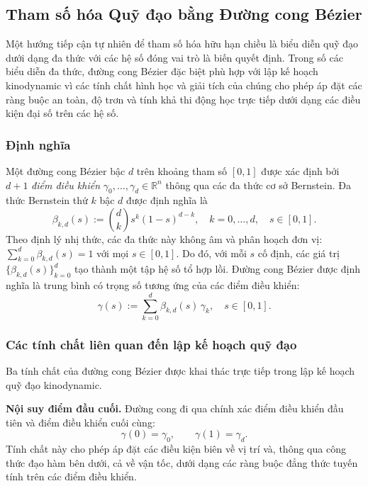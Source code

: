 \subsection{Tham số hóa Quỹ đạo bằng Đường cong Bézier}\label{subsec:bezier_parameterization}

Một hướng tiếp cận tự nhiên để tham số hóa hữu hạn chiều là biểu diễn quỹ đạo dưới dạng
đa thức với các hệ số đóng vai trò là biến quyết định.
Trong số các biểu diễn đa thức, đường cong Bézier đặc biệt phù hợp với lập kế hoạch
kinodynamic vì các tính chất hình học và giải tích của chúng cho phép áp đặt các ràng buộc
an toàn, độ trơn và tính khả thi động học trực tiếp dưới dạng các điều kiện đại số trên
các hệ số.

\subsubsection{Định nghĩa}

Một đường cong Bézier bậc $d$ trên khoảng tham số $[0,1]$ được xác định bởi
$d+1$ \emph{điểm điều khiển} $\gamma_0, \ldots, \gamma_d \in \mathbb{R}^{n}$
thông qua các đa thức cơ sở Bernstein.
Đa thức Bernstein thứ $k$ bậc $d$ được định nghĩa là
\begin{equation}
    \beta_{k,d}(s) := \binom{d}{k} s^{k}(1-s)^{d-k},
    \quad k = 0, \ldots, d, \quad s \in [0,1].
    \label{eq:bernstein}
\end{equation}
Theo định lý nhị thức, các đa thức này không âm và phân hoạch đơn vị:
$\sum_{k=0}^{d} \beta_{k,d}(s) = 1$ với mọi $s \in [0,1]$.
Do đó, với mỗi $s$ cố định, các giá trị $\{\beta_{k,d}(s)\}_{k=0}^{d}$ tạo thành một
tập hệ số tổ hợp lồi.
Đường cong Bézier được định nghĩa là trung bình có trọng số tương ứng của các điểm điều khiển:
\begin{equation}
    \gamma(s) := \sum_{k=0}^{d} \beta_{k,d}(s)\,\gamma_k,
    \quad s \in [0,1].
    \label{eq:bezier_curve}
\end{equation}

\subsubsection{Các tính chất liên quan đến lập kế hoạch quỹ đạo}

Ba tính chất của đường cong Bézier được khai thác trực tiếp trong lập kế hoạch quỹ đạo
kinodynamic.

\textbf{Nội suy điểm đầu cuối.}
Đường cong đi qua chính xác điểm điều khiển đầu tiên và điểm điều khiển cuối cùng:
\begin{equation}
    \gamma(0) = \gamma_0, \qquad \gamma(1) = \gamma_d.
    \label{eq:endpoint_interpolation}
\end{equation}
Tính chất này cho phép áp đặt các điều kiện biên về vị trí và, thông qua công thức đạo hàm
bên dưới, cả về vận tốc, dưới dạng các ràng buộc đẳng thức tuyến tính trên các điểm điều khiển.

